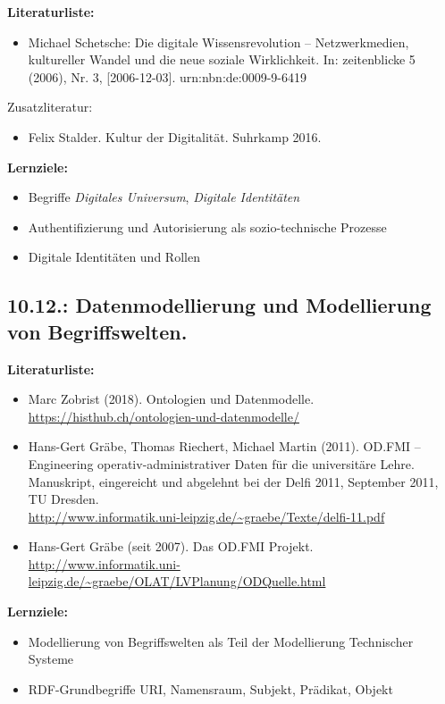 \documentclass[11pt,a4paper]{article}
\begin{document}
\textbf{Literaturliste:}
\begin{itemize}[noitemsep]
\item Michael Schetsche: Die digitale Wissensrevolution – Netzwerkmedien,
  kultureller Wandel und die neue soziale Wirklichkeit. In: zeitenblicke 5
  (2006), Nr. 3, [2006-12-03]. urn:nbn:de:0009-9-6419
\end{itemize}
Zusatzliteratur:
\begin{itemize}[noitemsep]
\item Felix Stalder. Kultur der Digitalität. Suhrkamp 2016.
\end{itemize}

\textbf{Lernziele:}
\begin{itemize}[noitemsep]
\item Begriffe \emph{Digitales Universum}, \emph{Digitale Identitäten}
\item Authentifizierung und Autorisierung als sozio-technische Prozesse
\item Digitale Identitäten und Rollen
\end{itemize}

\subsection{10.12.: Datenmodellierung und Modellierung von Begriffswelten.}

\textbf{Literaturliste:}
\begin{itemize}[noitemsep]
\item Marc Zobrist (2018). Ontologien und Datenmodelle. \\
  \url{https://histhub.ch/ontologien-und-datenmodelle/}
\item Hans-Gert Gräbe, Thomas Riechert, Michael Martin (2011).  OD.FMI –
  Engineering operativ-administrativer Daten für die universitäre Lehre.
  Manuskript, eingereicht und abgelehnt bei der Delfi 2011, September 2011, TU
  Dresden. \\
  \url{http://www.informatik.uni-leipzig.de/~graebe/Texte/delfi-11.pdf}
\item Hans-Gert Gräbe (seit 2007). Das OD.FMI Projekt. \\
  {\small \url{http://www.informatik.uni-leipzig.de/~graebe/OLAT/LVPlanung/ODQuelle.html}}
\end{itemize}

\textbf{Lernziele:}
\begin{itemize}[noitemsep]
\item Modellierung von Begriffswelten als Teil der Modellierung Technischer
  Systeme
\item RDF-Grundbegriffe URI, Namensraum, Subjekt, Prädikat, Objekt
\end{itemize}
\end{document}
